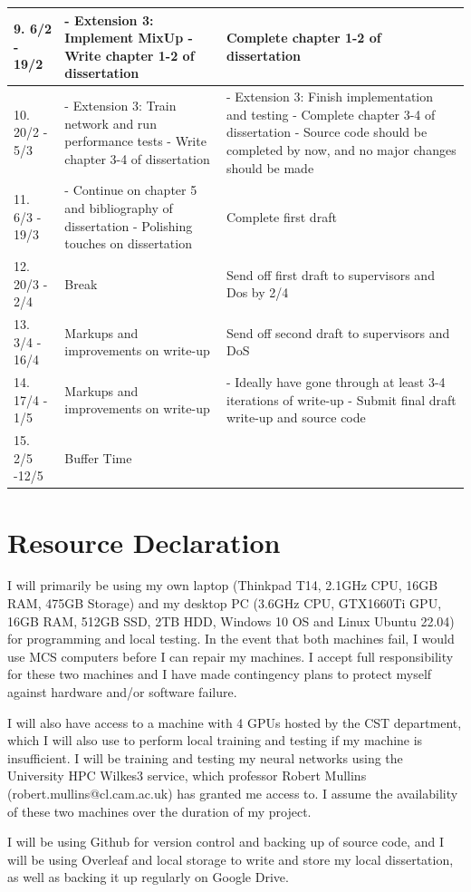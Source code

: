 \documentclass[60pt]{article}
\begin{document}
\begin{tabularx}{\textwidth}{|X|X|X|}
    \hline
    9. 6/2 - 19/2 & 
   - Extension 3: Implement MixUp \newline
   - Write chapter 1-2 of dissertation & 
   Complete chapter 1-2 of dissertation
   \\ \hline
    10. 20/2 - 5/3 &
   - Extension 3: Train network and run performance tests \newline 
   - Write chapter 3-4 of dissertation & 
   - Extension 3: Finish implementation and testing \newline 
   - Complete chapter 3-4 of dissertation \newline 
   - Source code should be completed by now, and no major changes should be made
   \\ \hline
    11. 6/3 - 19/3 & 
   - Continue on chapter 5 and bibliography of dissertation \newline 
   - Polishing touches on dissertation & 
   Complete first draft
   \\ \hline
   12. 20/3 - 2/4 & 
   Break & 
   Send off first draft to supervisors and Dos by 2/4
   \\ \hline
   13. 3/4 - 16/4 & 
   Markups and improvements on write-up & 
   Send off second draft to supervisors and DoS 
   \\ \hline
   14. 17/4 - 1/5 & 
   Markups and improvements on write-up & 
   - Ideally have gone through at least 3-4 iterations of write-up \newline 
   - Submit final draft write-up and source code  \\
   \hline 
   15. 2/5 -12/5 & 
   Buffer Time &
   \\ \hline
\end{tabularx}
\section{Resource Declaration}
\par
I will primarily be using my own laptop (Thinkpad T14, 2.1GHz CPU, 16GB RAM, 475GB Storage) and my desktop PC (3.6GHz CPU, GTX1660Ti GPU, 16GB RAM, 512GB SSD, 2TB HDD, Windows 10 OS and Linux Ubuntu 22.04) for programming and local testing. In the event that both machines fail, I would use MCS computers before I can repair my machines. I accept full responsibility for these two machines and I have made contingency plans to protect myself against hardware and/or software failure. 

\par
I will also have access to a machine with 4 GPUs hosted by the CST department, which I will also use to perform local training and testing if my machine is insufficient. I will be training and testing my neural networks using the University HPC Wilkes3 service, which professor Robert Mullins (robert.mullins@cl.cam.ac.uk) has granted me access to. I assume the availability of these two machines over the duration of my project.

\par
I will be using Github for version control and backing up of source code, and I will be using Overleaf and local storage to write and store my local dissertation, as well as backing it up regularly on Google Drive.



\end{document}
